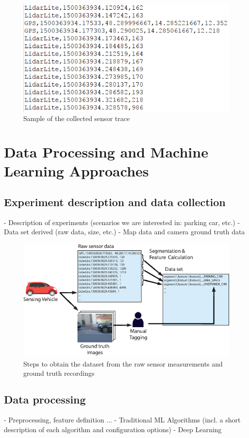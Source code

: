 \begin{figure}
	\centering
	\includegraphics{img/sample-sensor-trace.PNG}
	\caption{Sample of the collected sensor trace}
	\label{fig:sample_sensor_trace}
\end{figure}







\chapter{Data Processing and Machine Learning Approaches}

\section{Experiment description and data collection}
\label{sec:experiment_description_data_collection}
- Description of experiments (scenarios we are interested in: parking car, etc.)
- Data set derived (raw data, size, etc.)
- Map data and camera ground truth data

\begin{figure}
	\centering
	\includegraphics[width=\textwidth]{img/obtaining-dataset-architecture.eps}
	\caption{Steps to obtain the dataset from the raw sensor measurements and ground truth recordings}
	\label{fig:dataset_architecture}
\end{figure}

\section{Data processing}
\label{sec:data_processing}
- Preprocessing, feature definition ...
- Traditional ML Algorithms (incl. a short description of each algorithm and configuration options)
- Deep Learning
